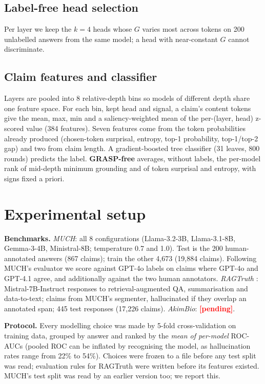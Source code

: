 \documentclass[11pt]{article}
\newcommand{\pending}{\textcolor{red}{\textbf{[pending]}}}
\begin{document}
\subsection{Label-free head selection}
Per layer we keep the $k{=}4$ heads whose $G$ varies most across tokens on 200 unlabelled answers
from the same model; a head with near-constant $G$ cannot discriminate.

\subsection{Claim features and classifier}
Layers are pooled into 8 relative-depth bins so models of different depth share one feature space.
For each bin, kept head and signal, a claim's content tokens give the mean, max, min and a
saliency-weighted mean of the per-(layer, head) z-scored value (384 features). Seven features come
from the token probabilities already produced (chosen-token surprisal, entropy, top-1 probability,
top-1/top-2 gap) and two from claim length. A gradient-boosted tree classifier (31 leaves, 800
rounds) predicts the label. \textbf{GRASP-free} averages, without labels, the per-model rank of
mid-depth minimum grounding and of token surprisal and entropy, with signs fixed a priori.

\section{Experimental setup}
\textbf{Benchmarks.} \emph{MUCH}: all 8 configurations (Llama-3.2-3B, Llama-3.1-8B, Gemma-3-4B,
Ministral-8B; temperature 0.7 and 1.0). Test is the 200 human-annotated answers (867 claims); train
the other 4,673 (19,884 claims). Following MUCH's evaluator we score against GPT-4o labels on
claims where GPT-4o and GPT-4.1 agree, and additionally against the two human annotators.
\emph{RAGTruth} \citep{niu-etal-2024-ragtruth}: Mistral-7B-Instruct responses to retrieval-augmented
QA, summarisation and data-to-text; claims from MUCH's segmenter, hallucinated if they overlap an
annotated span; 445 test responses (17,226 claims). \emph{AkimBio}: \pending{}.

\textbf{Protocol.} Every modelling choice was made by 5-fold cross-validation on training data,
grouped by answer and ranked by the \emph{mean of per-model} ROC-AUCs (pooled ROC can be inflated
by recognising the model, as hallucination rates range from 22\% to 54\%). Choices were frozen to a
file before any test split was read; evaluation rules for RAGTruth were written before its features
existed. MUCH's test split was read by an earlier version too; we report this.
\end{document}
